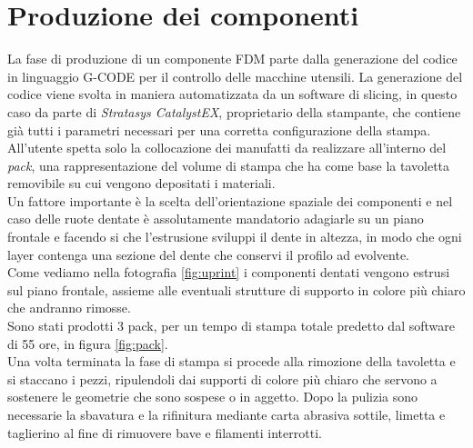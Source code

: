 \documentclass[%
corpo=11pt,
twoside,
 stile=classica,
oldstyle,
greek,%
]{toptesi}
\begin{document}
	\section{Produzione dei componenti}
		La fase di produzione di un componente FDM parte dalla generazione del codice in linguaggio G-CODE per il controllo delle macchine utensili. 
	La generazione del codice viene svolta in maniera automatizzata da un software di slicing, in questo caso da parte di \textit{Stratasys CatalystEX},  proprietario della stampante, che contiene già tutti i parametri necessari per una corretta configurazione della stampa. \\
	All'utente spetta solo la collocazione dei manufatti da realizzare all'interno del \textit{pack}, una rappresentazione del volume di stampa che ha come base la tavoletta removibile su cui vengono depositati i materiali.\\
	Un fattore importante è la scelta dell'orientazione spaziale dei componenti e nel caso delle ruote dentate è assolutamente mandatorio adagiarle su un piano frontale e facendo si che l'estrusione sviluppi il dente in altezza, in modo che ogni layer contenga una sezione del dente che conservi il profilo ad evolvente.\\ Come vediamo nella fotografia \ref{fig:uprint} i componenti dentati vengono estrusi sul piano frontale, assieme alle eventuali strutture di supporto in colore più chiaro che andranno rimosse. \\
	Sono stati prodotti 3 pack, per un tempo di stampa totale predetto dal software di 55 ore, in figura \ref{fig:pack}.\\
	Una volta terminata la fase di stampa si procede alla rimozione della tavoletta e si staccano i pezzi, ripulendoli dai supporti di colore più chiaro che servono a sostenere le geometrie che sono sospese o in aggetto. 
	Dopo la pulizia sono necessarie la sbavatura e la rifinitura mediante carta abrasiva sottile, limetta e taglierino al fine di rimuovere bave e filamenti interrotti. 
\end{document}
